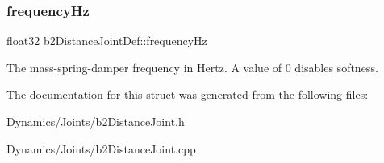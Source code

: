 \subsubsection{\texorpdfstring{frequency\+Hz}{frequencyHz}}
{\footnotesize\ttfamily float32 b2\+Distance\+Joint\+Def\+::frequency\+Hz}

The mass-\/spring-\/damper frequency in Hertz. A value of 0 disables softness. 

The documentation for this struct was generated from the following files\+:\begin{DoxyCompactItemize}
\item 
Dynamics/\+Joints/b2\+Distance\+Joint.\+h\item 
Dynamics/\+Joints/b2\+Distance\+Joint.\+cpp\end{DoxyCompactItemize}
